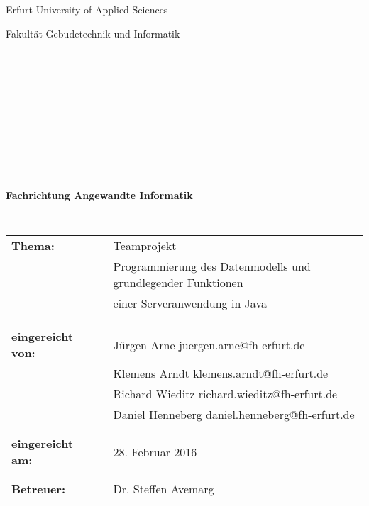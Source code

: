 
\thispagestyle{empty}
\begin{center}
\Large{Erfurt University of Applied Sciences}\\
\end{center}


\begin{center}
\Large{Fakultät Gebudetechnik und Informatik}
\end{center}
\begin{verbatim}








\end{verbatim}
\begin{center}
\textbf{\LARGE{\artderausarbeitung}}
\end{center}
\begin{verbatim}




\end{verbatim}
\begin{center}
\textbf{Fachrichtung Angewandte Informatik}
\end{center}
\newpage{}
\begin{verbatim}


\end{verbatim}

\begin{flushleft}
\begin{tabular}{lll}
\textbf{Thema:} & & Teamprojekt \\
& & Programmierung des Datenmodells und grundlegender Funktionen \\
& & einer Serveranwendung in Java\\
& & \\
& & \\
& & \\
\textbf{eingereicht von:} & & Jürgen Arne juergen.arne@fh-erfurt.de\\
& & Klemens Arndt klemens.arndt@fh-erfurt.de\\
& & Richard Wieditz richard.wieditz@fh-erfurt.de\\
& & Daniel Henneberg daniel.henneberg@fh-erfurt.de\\
& & \\
& & \\
\textbf{eingereicht am:} & & 28. Februar 2016\\
& & \\
& & \\
\textbf{Betreuer:} & & Dr. Steffen Avemarg
\end{tabular}
\end{flushleft}